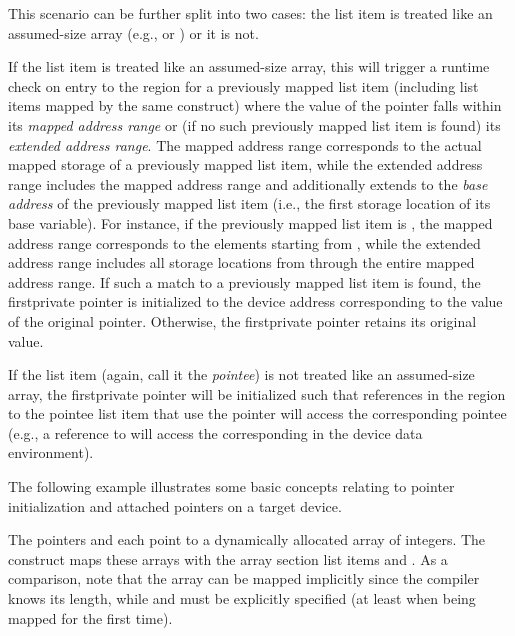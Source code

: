 This scenario can be further split into two
cases: the list item is treated like an assumed-size array (e.g., 
or ) or it is not.

If the list item is treated like an assumed-size array, this will trigger a
runtime check on entry to the  region for a previously mapped
list item (including list items mapped by the same construct) where the value
of the pointer falls within its \emph{mapped address range} or (if no such previously
mapped list item is found) its \emph{extended address range}. The mapped
address range corresponds to the actual mapped storage of a previously mapped
list item, while the extended address range includes the mapped address
range and additionally extends to the \emph{base address} of the previously
mapped list item (i.e., the first storage location of its base variable). For
instance, if the previously mapped list item is , the mapped
address range corresponds to the  elements starting from ,
while the extended address range includes all storage locations from
 through the entire mapped address range. If such a match to a
previously mapped list item is found, the firstprivate pointer is initialized
to the device address corresponding to the value of the original pointer.
Otherwise, the firstprivate pointer retains its original value.

If the list item (again, call it the \emph{pointee}) is not treated like an
assumed-size array, the firstprivate pointer will be initialized such that
references in the  region to the pointee list item that use the
pointer will access the corresponding pointee (e.g., a reference to
 will access the corresponding  in the device data
environment).

The following example illustrates some basic concepts relating to pointer
initialization and attached pointers on a target device.

The pointers  and  each point to a dynamically
allocated array of  integers. The  construct maps these
arrays with the array section list items  and .
As a comparison, note that the array  can be mapped implicitly since
the compiler knows its length, while  and  must
be explicitly specified (at least when being mapped for the first time).

